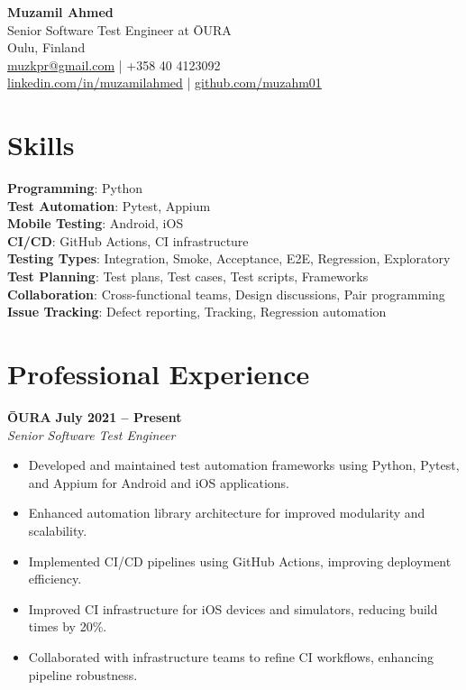 \documentclass[12pt]{article}
\begin{document}
\begin{center}
    {\LARGE \textbf{Muzamil Ahmed}}\\
    Senior Software Test Engineer at ŌURA \\
    \vspace{0.1cm}
    Oulu, Finland \\
    \href{mailto:muzkpr@gmail.com}{muzkpr@gmail.com} \quad | \quad +358 40 4123092 \\
    \href{https://linkedin.com/in/muzamilahmed}{linkedin.com/in/muzamilahmed} \quad | \quad \href{https://github.com/muzahm01}{github.com/muzahm01}
    \vspace{0.2cm}
\end{center}

\section*{Skills}

\textbf{Programming}: Python \\
\textbf{Test Automation}: Pytest, Appium \\
\textbf{Mobile Testing}: Android, iOS \\
\textbf{CI/CD}: GitHub Actions, CI infrastructure \\
\textbf{Testing Types}: Integration, Smoke, Acceptance, E2E, Regression, Exploratory \\
\textbf{Test Planning}: Test plans, Test cases, Test scripts, Frameworks \\
\textbf{Collaboration}: Cross-functional teams, Design discussions, Pair programming \\
\textbf{Issue Tracking}: Defect reporting, Tracking, Regression automation

\section*{Professional Experience}

\textbf{ŌURA} \hfill \textbf{July 2021 – Present} \\
\textit{Senior Software Test Engineer} \\
\begin{itemize}
    \item Developed and maintained test automation frameworks using Python, Pytest, and Appium for Android and iOS applications.
    \item Enhanced automation library architecture for improved modularity and scalability.
    \item Implemented CI/CD pipelines using GitHub Actions, improving deployment efficiency.
    \item Improved CI infrastructure for iOS devices and simulators, reducing build times by 20\%.
    \item Collaborated with infrastructure teams to refine CI workflows, enhancing pipeline robustness.
\end{itemize}
\end{document}
